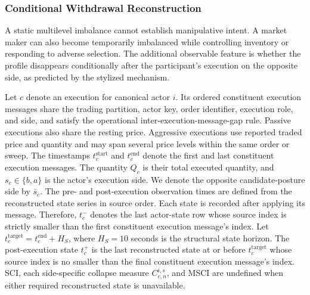 \documentclass[11pt]{article}
\begin{document}
\FloatBarrier

\subsubsection{Conditional Withdrawal Reconstruction}
\label{subsec:multilevel_conditionality}

A static multilevel imbalance cannot establish manipulative intent. A market maker can also become temporarily imbalanced
while controlling inventory or responding to adverse selection. The additional observable feature is whether the profile
disappears conditionally after the participant's execution on the opposite side, as predicted by the stylized mechanism.

Let $c$ denote an execution for canonical actor $i$. Its ordered constituent execution messages share the trading partition,
actor key, order identifier, execution role, and side, and satisfy the operational inter-execution-message-gap rule. Passive executions
also share the resting price. Aggressive executions use reported traded price and quantity and may span
several price levels within the same order or sweep. The timestamps $t_c^{\mathrm{start}}$ and $t_c^{\mathrm{end}}$ denote
the first and last constituent execution messages. The quantity $Q_c$ is their total executed quantity, and $s_c\in\{b,a\}$ is the actor's
execution side. We denote the opposite candidate-posture side by $\bar{s}_c$. The pre- and post-execution observation times are
defined from the reconstructed state series in source order. Each state is recorded after applying its message. Therefore,
$t_c^{-}$ denotes the last actor-state row whose source index is strictly smaller than the first constituent execution message's index. Let
$t_c^{\mathrm{target}}=t_c^{\mathrm{end}}+H_S$, where $H_S=10$ seconds is the structural state horizon. The post-execution
state $t_c^{+}$ is the last reconstructed state at or before $t_c^{\mathrm{target}}$ whose source index is no smaller than
the final constituent execution message's index. SCI, each side-specific collapse measure $C^{i,s}_{c,n}$, and MSCI are undefined when either
required reconstructed state is unavailable.
\end{document}
